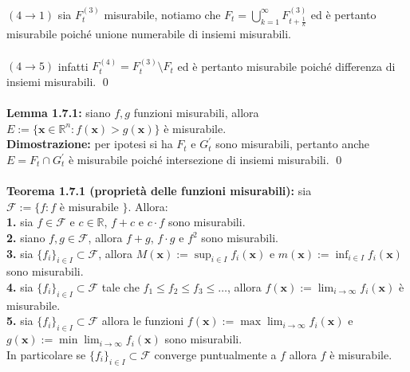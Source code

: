 \documentclass{article}
\numberwithin{equation}{subsection}
\begin{document}
${(4 \rightarrow 1)}$ sia $F_t^{(3)}$ misurabile, notiamo che $F_t = \bigcup_{k = 1}^\infty F_{t + \frac{1}{k}}^{(3)}$ ed è pertanto misurabile poiché unione numerabile di insiemi misurabili. \\ \\
${(4 \rightarrow 5)}$ infatti $F_t^{(4)} = F_t^{(3)} \setminus F_t$ ed è pertanto misurabile poiché differenza di insiemi misurabili. \qed \\ \\
\textbf{Lemma 1.7.1:} siano $f, g$ funzioni misurabili, allora $E := \{ \mathbf{x} \in \mathbb{R}^n : f(\mathbf{x}) > g(\mathbf{x}) \}$ è misurabile. \\

\textbf{Dimostrazione:} per ipotesi si ha $F_t$ e $G_t^{'}$ sono misurabili, pertanto anche $E = F_t \cap G_t^{'}$ è misurabile poiché intersezione di insiemi misurabili. \qed \\ \\
\textbf{Teorema 1.7.1 (proprietà delle funzioni misurabili):} sia $\mathcal{F} := \{ f : f \text{ è misurabile } \}$. Allora: \\
\textbf{1.} sia $f \in \mathcal{F}$ e $c \in \mathbb{R}$, $f + c$ e $c \cdot f$ sono misurabili. \\
\textbf{2.} siano $f, g \in \mathcal{F}$, allora $f + g$, $f \cdot g$ e $f^2$ sono misurabili. \\
\textbf{3.} sia $\{ f_i \}_{i \in I} \subset \mathcal{F}$, allora $M(\mathbf{x}) := \sup_{i \in I} f_i(\mathbf{x})$ e $m(\mathbf{x}) := \inf_{i \in I} f_i(\mathbf{x})$ sono misurabili. \\
\textbf{4.} sia $\{ f_i \}_{i \in I} \subset \mathcal{F}$ tale che $f_1 \leq f_2 \leq f_3 \leq \dots$, allora $f(\mathbf{x}) := \lim_{i \rightarrow \infty} f_i(\mathbf{x})$ è misurabile. \\
\textbf{5.} sia $\{ f_i \}_{i \in I} \subset \mathcal{F}$ allora le funzioni $f(\mathbf{x}) := \max \lim_{i \rightarrow \infty} f_i(\mathbf{x})$ e $g(\mathbf{x}) := \min \lim_{i \rightarrow \infty} f_i(\mathbf{x})$ sono misurabili. \\
In particolare se $\{ f_i \}_{i \in I} \subset \mathcal{F}$ converge puntualmente a $f$ allora $f$ è misurabile. \\
\end{document}

